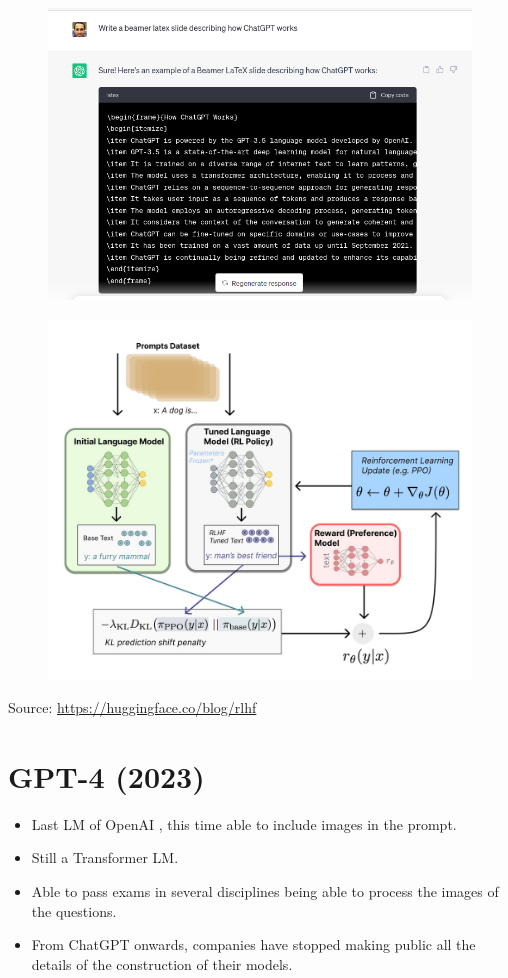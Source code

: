 \begin{figure}[h]
	\includegraphics[scale = 0.25]{pics/chatgpt.png}
\end{figure}




 \begin{figure}[h]
        	\includegraphics[scale = 0.12]{pics/RLHF.png}
        \end{figure}
        Source: \url{https://huggingface.co/blog/rlhf}


\section{GPT-4 (2023)}
\begin{itemize}
\item Last LM of OpenAI \cite{openai2023gpt4}, this time able to include images in the prompt.
\item Still a Transformer LM.
\item Able to pass exams in several disciplines being able to process the images of the questions.
\item From ChatGPT onwards, companies have stopped making public all the details of the construction of their models.
\end{itemize}

